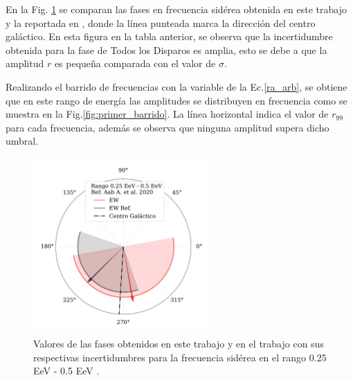 En la Fig. \ref{fig:primer} se comparan las  fases en frecuencia sidérea obtenida en este trabajo y la reportada en \cite{Aab_2020}, donde la línea punteada marca la dirección del centro galáctico.  En esta figura en la tabla anterior, se observa que la incertidumbre obtenida para la fase de Todos los Disparos es amplia, esto se debe a que la amplitud $r$ es pequeña comparada con el valor de $\sigma$. 


Realizando el barrido de frecuencias con la variable de la Ec.\ref{ra_arb}, se obtiene que en este rango de energía las amplitudes se  distribuyen en frecuencia como se muestra en la Fig.\ref{fig:primer_barrido}. La línea horizontal indica el valor de $r_{99}$ para cada frecuencia, además se observa que ninguna amplitud supera dicho umbral.

\begin{figure}[H]
    \begin{small}
        \begin{center}
            \includegraphics[width=0.6\textwidth]{phase_primer_bin_v3.pdf}
        \end{center}
        \caption{Valores de las fases obtenidos en este trabajo y en el trabajo \cite{Aab_2020} con sus respectivas incertidumbres para la frecuencia sidérea en el  rango 0.25 EeV - 0.5 EeV .}
        \label{fig:primer}
    \end{small}
\end{figure}

